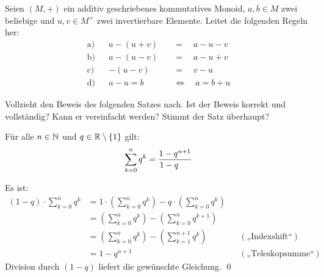 \begin{aufg}
    Seien $(M,+)$ ein additiv geschriebenes kommutatives Monoid, $a,b\in M$ zwei beliebige und $u,v\in M^\times$ zwei invertierbare Elemente. Leitet die folgenden Regeln her:
    \begin{align*}
        \text{a)} && a-(u+v) \quad&=\quad a-u-v \\
        \text{b)} && a-(u-v) \quad&=\quad a-u+v \\
        \text{c)} && -(u-v) \quad&=\quad v-u \\
        \text{d)} && a-u=b \quad&\Leftrightarrow\quad a=b+u
    \end{align*}
\end{aufg}


\begin{comment}
\begin{aufg}[Kürzbarkeit]
    Sei $(M,*)$ ein Monoid. Ein Element $a\in M$ heißt \textbf{kürzbar}, wenn „Multiplikation mit $a$“ eine Äquivalenzumformung ist, d.h. wenn für alle $x,y\in M$ die beiden Äquivalenzen
    \begin{align*}
        a*x& =a*y \quad \leftrightarrow\quad x=y\\
        \text{und}\qquad x*a& =y*a \quad \leftrightarrow\quad x=y
    \end{align*}
    gelten.
    \begin{enumerate}
        \item Beweist, dass jedes invertierbare Element kürzbar ist.
        \item Ist ein kürzbares Element auch immer invertierbar?
    \end{enumerate}
\end{aufg}
\end{comment}


\begin{aufg} \label{aufg:geometrischereihe}
    Vollzieht den Beweis des folgenden Satzes nach. Ist der Beweis korrekt und vollständig? Kann er vereinfacht werden? Stimmt der Satz überhaupt?
    \begin{satz}
        Für alle $n\in \mathbb N$ und $q\in \mathbb R\setminus \{1\}$ gilt:
            \[ \sum_{k=0}^n q^k = \frac{1-q^{n+1}}{\kern-1.4em1-q} \]
    \end{satz}
    \begin{bew}
        Es ist:
        \begin{align*}
            (1-q) \cdot \sum_{k=0}^n q^k & = 1\cdot \left( \sum_{k=0}^n q^k \right) - q\cdot \left( \sum_{k=0}^n q^k \right) \\
            & = \left( \sum_{k=0}^n q^k \right) - \left( \sum_{k=0}^{n} q^{k+1} \right) \\
            & = \left( \sum_{k=0}^n q^k \right) - \left( \sum_{k=1}^{n+1} q^{k} \right) && (\text{„Indexshift“}) \\
            & = 1 - q^{n+1} && (\text{„Teleskopsumme“})
        \end{align*}
    Division durch $(1-q)$ liefert die gewünschte Gleichung. \qed
    \end{bew}
\end{aufg}

